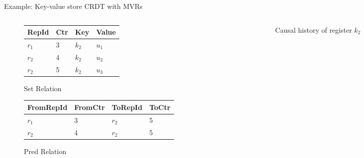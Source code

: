 \documentclass[USenglish,aspectratio=169]{beamer} %
\newcommand{\setop}[5][set]{$\mathit{#1}_{#2}^{#3} (#4, #5)$}
\begin{document}
\begin{frame}{Example: Key-value store \acs{CRDT} with \aclp{MVR}}
    \begin{columns}
        \begin{column}{0.5\textwidth}
            \begin{figure}
                \centering
                \begin{tabular}{@{}llll@{}}
                    \toprule
                    RepId   & Ctr    & Key     & Value   \\
                    \midrule
                    \(r_1\) & 3      & \(k_2\) & \(u_1\) \\
                    \(r_2\) & 4      & \(k_2\) & \(u_2\) \\
                    \(r_2\) & 5      & \(k_2\) & \(u_3\) \\
                    \bottomrule
                \end{tabular}
                \caption{Set Relation}
            \end{figure}
            \begin{figure}
                \centering
                \begin{tabular}{@{}llll@{}}
                    \toprule
                    FromRepId & FromCtr & ToRepId & ToCtr  \\
                    \midrule
                    \(r_1\)   & 3       & \(r_2\) & 5      \\
                    \(r_2\)   & 4       & \(r_2\) & 5      \\
                    \bottomrule
                \end{tabular}
                \caption{Pred Relation}
            \end{figure}
        \end{column}
        \pause
        \begin{column}{0.5\textwidth}
            \begin{figure}
                \centering
                \caption{Causal history of register \(k_2\)}\label{fig:causal-history-k2}
            \end{figure}
        \end{column}
    \end{columns}
\end{frame}
\end{document}
